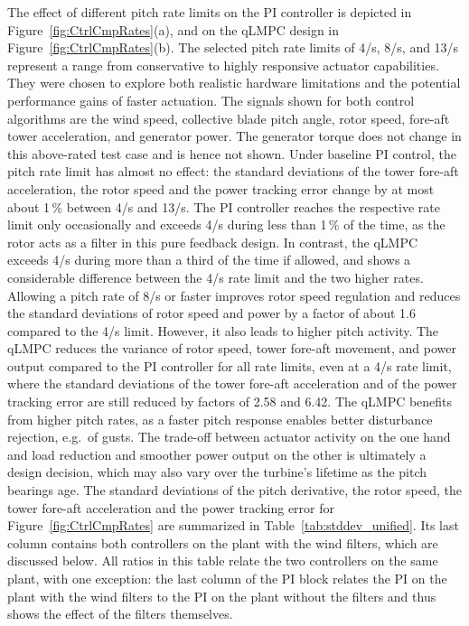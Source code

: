 The effect of different pitch rate limits on the PI controller is depicted in Figure~\ref{fig:CtrlCmpRates}(a), and on the qLMPC design in Figure~\ref{fig:CtrlCmpRates}(b). The selected pitch rate limits of 4\textdegree/s, 8\textdegree/s, and 13\textdegree/s represent a range from conservative to highly responsive actuator capabilities. They were chosen to explore both realistic hardware limitations and the potential performance gains of faster actuation. The signals shown for both control algorithms are the wind speed, collective blade pitch angle, rotor speed, fore-aft tower acceleration, and generator power. The generator torque does not change in this above-rated test case and is hence not shown. Under baseline PI control, the pitch rate limit has almost no effect: the standard deviations of the tower fore-aft acceleration, the rotor speed and the power tracking error change by at most about 1\,\% between 4\textdegree/s and 13\textdegree/s. The PI controller reaches the respective rate limit only occasionally and exceeds 4\textdegree/s during less than 1\,\% of the time, as the rotor acts as a filter in this pure feedback design. In contrast, the qLMPC exceeds 4\textdegree/s during more than a third of the time if allowed, and shows a considerable difference between the 4\textdegree/s rate limit and the two higher rates. Allowing a pitch rate of 8\textdegree/s or faster improves rotor speed regulation and reduces the standard deviations of rotor speed and power by a factor of about 1.6 compared to the 4\textdegree/s limit. However, it also leads to higher pitch activity. The qLMPC reduces the variance of rotor speed, tower fore-aft movement, and power output compared to the PI controller for all rate limits, even at a 4\textdegree/s rate limit, where the standard deviations of the tower fore-aft acceleration and of the power tracking error are still reduced by factors of 2.58 and 6.42. The qLMPC benefits from higher pitch rates, as a faster pitch response enables better disturbance rejection, e.g.\ of gusts. The trade-off between actuator activity on the one hand and load reduction and smoother power output on the other is ultimately a design decision, which may also vary over the turbine's lifetime as the pitch bearings age. The standard deviations of the pitch derivative, the rotor speed, the tower fore-aft acceleration and the power tracking error for Figure~\ref{fig:CtrlCmpRates} are summarized in Table~\ref{tab:stddev_unified}. Its last column contains both controllers on the plant with the wind filters, which are discussed below. All ratios in this table relate the two controllers on the same plant, with one exception: the last column of the PI block relates the PI on the plant with the wind filters to the PI on the plant without the filters and thus shows the effect of the filters themselves.

